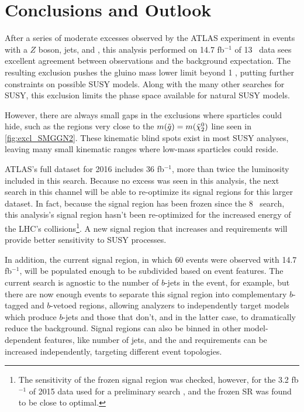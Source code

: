 
\chapter{Conclusions and Outlook} %
\label{ch:conc} 

After a series of moderate excesses observed by the \ac{ATLAS} experiment in events with a $Z$ boson, jets, and \met, this analysis performed on 14.7 fb$^{-1}$ of 13 \tev~data sees excellent agreement between observations and the background expectation. The resulting exclusion pushes the gluino mass lower limit beyond 1 \tev, putting further constraints on possible \ac{SUSY} models. Along with the many other searches for \ac{SUSY}, this exclusion limits the phase space available for natural \ac{SUSY} models. %

However, there are always small gaps in the exclusions where sparticles could hide, such as the regions very close to the $m({{\tilde g}}) = m(\tilde{\chi}^{0}_{2})$ line seen in \autoref{fig:excl_SMGGN2}. These kinematic blind spots exist in most \ac{SUSY} analyses, leaving many small kinematic ranges where low-mass sparticles could reside.

\ac{ATLAS}'s full dataset for 2016 includes 36 fb$^{-1}$, more than twice the luminosity included in this search. Because no excess was seen in this analysis, the next search in this channel will be able to re-optimize its signal regions for this larger dataset. In fact, because the signal region has been frozen since the 8 \tev~search, this analysis's signal region hasn't been re-optimized for the increased energy of the \ac{LHC}'s collisions\footnote{The sensitivity of the frozen signal region was checked, however, for the 3.2 fb$^{-1}$ of 2015 data used for a preliminary search \cite{ATLAS-CONF-2015-082}, and the frozen \ac{SR} was found to be close to optimal.}. A new signal region that increases \met and \HT requirements will provide better sensitivity to \ac{SUSY} processes. 

In addition, the current signal region, in which 60 events were observed with 14.7 fb$^{-1}$, will be populated enough to be subdivided based on event features. The current search is agnostic to the number of $b$-jets in the event, for example, but there are now enough events to separate this signal region into complementary $b$-tagged and $b$-vetoed regions, allowing analyzers to independently target models which produce $b$-jets and those that don't, and in the latter case, to dramatically reduce the \ttbar background. Signal regions can also be binned in other model-dependent features, like number of jets, and the \met and \HT requirements can be increased independently, targeting different event topologies. 

